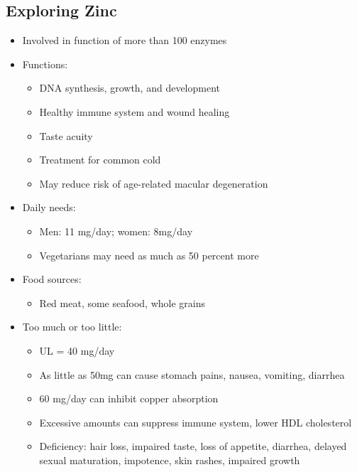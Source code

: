 \documentclass[12pt]{article}
\begin{document}
        \subsection{Exploring Zinc}
            \begin{itemize}
                \item Involved in function of more than 100 enzymes
                \item Functions:
                    \begin{itemize}
                        \item DNA synthesis, growth, and development
                        \item Healthy immune system and wound healing
                        \item Taste acuity
                        \item Treatment for common cold
                        \item May reduce risk of age-related macular degeneration
                    \end{itemize}
                \item Daily needs:
                    \begin{itemize}
                        \item Men: 11 mg/day; women: 8mg/day
                        \item Vegetarians may need as much as 50 percent more
                    \end{itemize}
                \item Food sources:
                    \begin{itemize}
                        \item Red meat, some seafood, whole grains
                    \end{itemize}
                \item Too much or too little:
                    \begin{itemize}
                        \item UL = 40 mg/day
                        \item As little as 50mg can cause stomach pains, nausea, vomiting, diarrhea
                        \item 60 mg/day can inhibit copper absorption
                        \item Excessive amounts can suppress immune system, lower HDL cholesterol
                        \item Deficiency: hair loss, impaired taste, loss of appetite, diarrhea, delayed sexual maturation, impotence, skin rashes, impaired growth
                    \end{itemize}
            \end{itemize}
\end{document}
